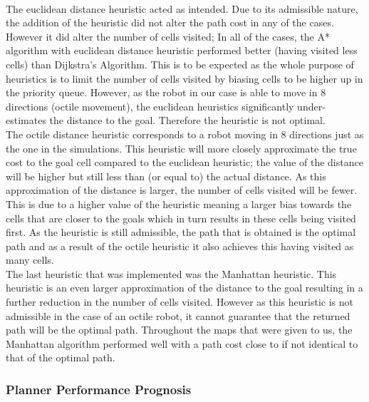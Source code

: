 \documentclass[a4paper,12pt]{article}
\begin{document}
				\\
				The euclidean distance heuristic acted as intended. Due to its admissible nature, the addition of the heuristic did not alter the path cost in any of the cases. However it did alter the number of cells visited; In all of the cases, the A* algorithm with euclidean distance heuristic performed better (having visited less cells) than Dijkstra's Algorithm. This is to be expected as the whole purpose of heuristics is to limit the number of cells visited by biasing cells to be higher up in the priority queue. However, as the robot in our case is able to move in 8 directions (octile movement), the euclidean heuristics significantly under-estimates the distance to the goal. Therefore the heuristic is not optimal.
				\\
				The octile distance heuristic corresponds to a robot moving in 8 directions just as the one in the simulations. This heuristic will more closely approximate the true cost to the goal cell compared to the euclidean heuristic; the value of the distance will be higher but still less than (or equal to) the actual distance. As this approximation of the distance is larger, the number of cells visited will be fewer. This is due to a higher value of the heuristic meaning a larger bias towards the cells that are closer to the goals which in turn results in these cells being visited first. As the heuristic is still admissible, the path that is obtained is the optimal path and as a result of the octile heuristic it also achieves this having visited as many cells. 
				\\
				The last heuristic that was implemented was the Manhattan heuristic. This heuristic is an even larger approximation of the distance to the goal resulting in a further reduction in the number of cells visited. However as this heuristic is not admissible in the case of an octile robot, it cannot guarantee that the returned path will be the optimal path. Throughout the maps that were given to us, the Manhattan algorithm performed well with a path cost close to if not identical to that of the optimal path. 
				
			\subsubsection{Planner Performance Prognosis}
			
\end{document}
